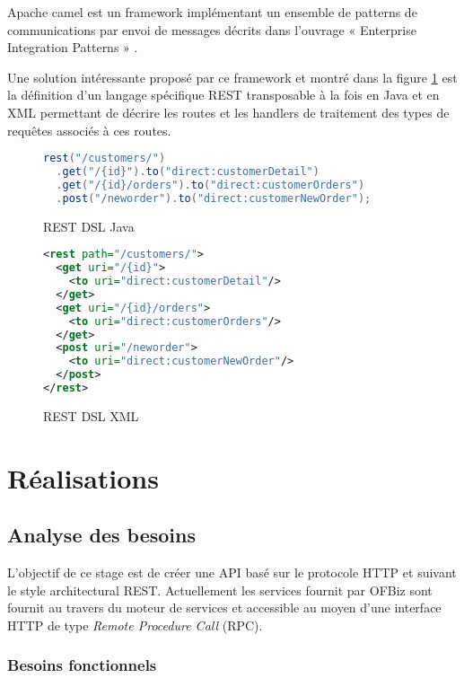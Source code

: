 \documentclass[a4paper, 11pt]{report}
\begin{document}
Apache camel est un framework implémentant un ensemble de patterns de
communications par envoi de messages décrits dans l'ouvrage «
Enterprise Integration Patterns » \cite{hohpe2003enterprise}.

Une solution intéressante proposé par ce framework et montré dans la
figure \ref{fig:restdsl} est la définition d'un langage spécifique REST
transposable à la fois en Java et en XML permettant de décrire les
routes et les handlers de traitement des types de requêtes associés à
ces routes.

\begin{figure}
  \ContinuedFloat*
  \begin{lstlisting}[language=java]
rest("/customers/")
  .get("/{id}").to("direct:customerDetail")
  .get("/{id}/orders").to("direct:customerOrders")
  .post("/neworder").to("direct:customerNewOrder");
  \end{lstlisting}
  \caption{REST DSL Java}
\end{figure}

\begin{figure}
  \ContinuedFloat
  \begin{lstlisting}[language=xml]
<rest path="/customers/">
  <get uri="/{id}">
    <to uri="direct:customerDetail"/>
  </get>
  <get uri="/{id}/orders">
    <to uri="direct:customerOrders"/>
  </get>
  <post uri="/neworder">
    <to uri="direct:customerNewOrder"/>
  </post>
</rest>
  \end{lstlisting}
  \caption{REST DSL XML}
  \label{fig:restdsl}
\end{figure}

\chapter{Réalisations}

\section{Analyse des besoins}

L'objectif de ce stage est de créer une API basé sur le protocole HTTP
et suivant le style architectural REST.  Actuellement les services
fournit par OFBiz sont fournit au travers du moteur de services et
accessible au moyen d'une interface HTTP de type \emph{ Remote
  Procedure Call} (RPC).

\subsection{Besoins fonctionnels}
\end{document}
